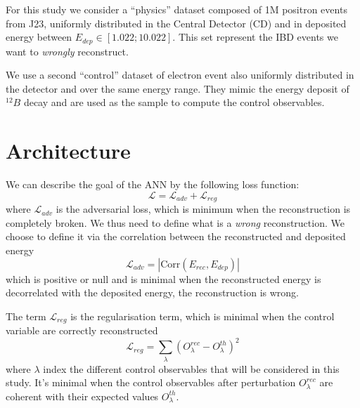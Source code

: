 \documentclass[../main.tex]{subfiles}
\begin{document}
For this study we consider a ``physics'' dataset composed of 1M positron events from J23, uniformly distributed in the Central Detector (CD) and in deposited energy between $E_{dep} \in [1.022; 10.022]$. This set represent the IBD events we want to \textit{wrongly} reconstruct.

We use a second ``control'' dataset of electron event also uniformly distributed in the detector and over the same energy range. They mimic the energy deposit of $^{12}B$ decay and are used as the sample to compute the control observables.

\section{Architecture}
\label{sec:janne:arch}
We can describe the goal of the ANN by the following loss function:
\begin{equation}
  \label{eq:janne:loss}
  \mathcal{L} = \mathcal{L}_{adv} + \mathcal{L}_{reg}
\end{equation}
where $\mathcal{L}_{adv}$ is the adversarial loss, which is minimum when the reconstruction is completely broken. We thus need to define what is a \textit{wrong} reconstruction. We choose to define it via the correlation between the reconstructed and deposited energy
\begin{equation}
  \mathcal{L}_{adv} = |\mathrm{Corr}(E_{rec}, E_{dep})|
\end{equation}
which is positive or null and is minimal when the reconstructed energy is decorrelated with the deposited energy, the reconstruction is wrong.

The term $\mathcal{L}_{reg}$ is the regularisation term, which is minimal when the control variable are correctly reconstructed
\begin{equation}
  \mathcal{L}_{reg} = \sum_\lambda (O^{rec}_\lambda - O^{th}_\lambda)^2
\end{equation}
where $\lambda$ index the different control observables that will be considered in this study. It's minimal when the control observables after perturbation $O^{rec}_\lambda$ are coherent with their expected values $O^{th}_\lambda$.
\end{document}
